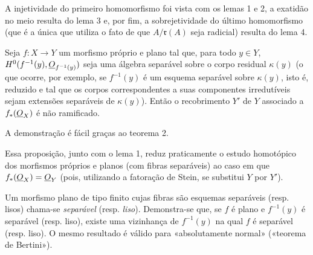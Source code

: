 A injetividade do primeiro homomorfismo foi vista com os lemas 1 e 2, a
exatidão no meio resulta do lema 3 e, por fim, a sobrejetividade do
último homomorfismo (que é a única que utiliza o fato de que
$A/\mathfrak r(A)$ seja radicial) resulta do lema 4.

 Seja $f:X\longrightarrow Y$ um morfismo próprio e plano
tal que, para todo $y\in Y$, $H^0(f^{-1}(y),\underline{O}_{f^{-1}(y)})$ seja uma álgebra
separável sobre o corpo residual $\kappa(y)$ (o que ocorre, por exemplo, se
$f^{-1}(y)$ é um esquema separável sobre $\kappa(y)$, isto é, reduzido e tal
que os corpos correspondentes a suas componentes irredutíveis sejam
extensões separáveis de $\kappa(y)$). Então o recobrimento $Y'$ de $Y$
associado a $f_*(\underline{O}_X)$ é não ramificado.

A demonstração é fácil graças ao teorema 2.

Essa proposição, junto com o lema 1, reduz praticamente o estudo
homotópico dos morfismos próprios e planos (com fibras separáveis) ao caso em
que $f_*(\underline{O}_X)=\underline{O}_Y$ (pois, utilizando a fatoração de Stein, se
substitui $Y$ por $Y'$).

 Um morfismo plano de tipo finito cujas fibras são
esquemas separáveis (resp. lisos) chama-se \emph{separável} (resp.
\emph{liso}). Demonstra-se que, se $f$ é plano e $f^{-1}(y)$ é separável
(resp. liso), existe uma vizinhança de $f^{-1}(y)$ na qual $f$ é separável
(resp. liso). O mesmo resultado é válido para «absolutamente normal»
(«teorema de Bertini»).

